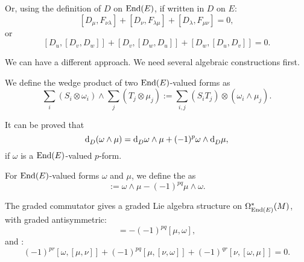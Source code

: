 \documentclass[openany, oneside, a5paper]{book}
\begin{document}
Or, using the definition of $D$ on $\operatorname{End}(E)$, if written in $D$ on $E$:
\begin{equation}\label{eq: Bianchi identity (D and F, local coordinates)}
    [D_\mu, F_{\nu \lambda}] + [D_\nu, F_{\lambda \mu}] + [D_\lambda, F_{\mu \nu}] = 0,
\end{equation}
or
\begin{equation}\label{eq: Bianchi identity (D, local coordinates)}
    [D_u, [D_v, D_w]] + [D_v, [D_w, D_u]] + [D_w, [D_u, D_v]] = 0.
\end{equation}

We can have a different approach.
We need several algebraic constructions first.

We define the wedge product of two $\operatorname{End}(E)$-valued forms as
\begin{equation}
    \sum_i (S_i \otimes \omega_i) \wedge \sum_j(T_j \otimes \mu_j) 
    := \sum_{i, j} (S_i T_j) \otimes (\omega_i \wedge \mu_j).
\end{equation}


It can be proved that
\begin{equation}
    \mathop{}\!\mathrm{d}^{}_D (\omega \wedge \mu) = \mathop{}\!\mathrm{d}^{}_D \omega \wedge \mu + (-1)^p \omega \wedge \mathop{}\!\mathrm{d}^{}_D \mu,
\end{equation}
if $\omega$ is a $\operatorname{End}(E)$-valued $p$-form.

\begin{definition}
    For $\operatorname{End}(E)$-valued forms $\omega$ and $\mu$, we define the  as
    \begin{equation}
        [\omega, \mu] := \omega \wedge \mu - (-1)^{pq} \mu \wedge \omega.
    \end{equation}
\end{definition}

The graded commutator gives a graded Lie algebra structure on $\Omega^*_{\operatorname{End}(E)}(M)$, with graded antisymmetric:
\begin{equation}
    [\omega, \mu] = - (-1)^{pq} [\mu, \omega],
\end{equation}
and :
\begin{equation}
    (-1)^{pr} [\omega, [\mu, \nu]] + (-1)^{pq} [\mu, [\nu, \omega]] + (-1)^{qr} [\nu, [\omega, \mu]] = 0.
\end{equation}
\end{document}
